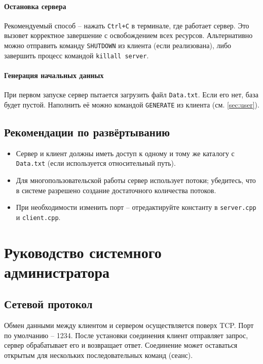 \documentclass[12pt,a4paper]{article}
\begin{document}
\paragraph{Остановка сервера}
Рекомендуемый способ – нажать \texttt{Ctrl+C} в терминале, где работает сервер. Это вызовет корректное завершение с освобождением всех ресурсов.  
Альтернативно можно отправить команду \texttt{SHUTDOWN} из клиента (если реализована), либо завершить процесс командой \texttt{killall server}.

\paragraph{Генерация начальных данных}
При первом запуске сервер пытается загрузить файл \texttt{Data.txt}. Если его нет, база будет пустой. Наполнить её можно командой \texttt{GENERATE} из клиента (см. \ref{sec:user}).

\subsection{Рекомендации по развёртыванию}
\begin{itemize}
  \item Сервер и клиент должны иметь доступ к одному и тому же каталогу с \texttt{Data.txt} (если используется относительный путь).
  \item Для многопользовательской работы сервер использует потоки; убедитесь, что в системе разрешено создание достаточного количества потоков.
  \item При необходимости изменить порт – отредактируйте константу в \texttt{server.cpp} и \texttt{client.cpp}.
\end{itemize}

\section{Руководство системного администратора}
\label{sec:sysadmin}

\subsection{Сетевой протокол}
Обмен данными между клиентом и сервером осуществляется поверх TCP. Порт по умолчанию – 1234. После установки соединения клиент отправляет запрос, сервер обрабатывает его и возвращает ответ. Соединение может оставаться открытым для нескольких последовательных команд (сеанс).
\end{document}
